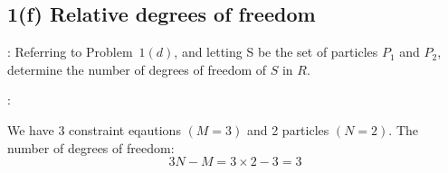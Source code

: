 \subsection{1(f) Relative degrees of freedom}
: Referring to Problem~$1(d)$, and letting S be the set of particles $P_1$ and $P_2$, determine the number of degrees of freedom of $S$ in $R$.

:

We have 3 constraint eqautions $(M=3)$ and 2 particles $(N=2)$. The number of degrees of freedom:
$$3N-M = 3 \times 2 - 3 = 3$$
